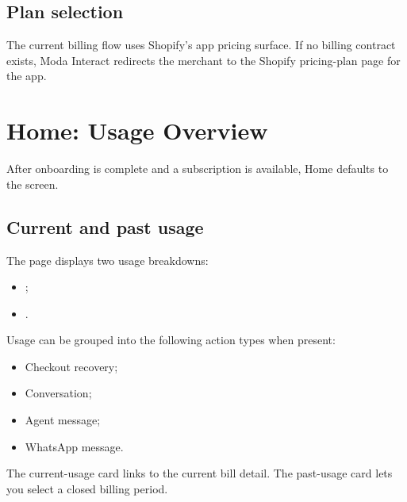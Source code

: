 \section{Plan selection}
The current billing flow uses Shopify's app pricing surface. If no billing contract exists, Moda Interact redirects the merchant to the Shopify pricing-plan page for the app.



\chapter{Home: Usage Overview}

After onboarding is complete and a subscription is available, Home defaults to the  screen.

\section{Current and past usage}
The page displays two usage breakdowns:
\begin{itemize}
  \item {};
  \item {}.
\end{itemize}

Usage can be grouped into the following action types when present:
\begin{itemize}
  \item Checkout recovery;
  \item Conversation;
  \item Agent message;
  \item WhatsApp message.
\end{itemize}

The current-usage card links to the current bill detail. The past-usage card lets you select a closed billing period.


